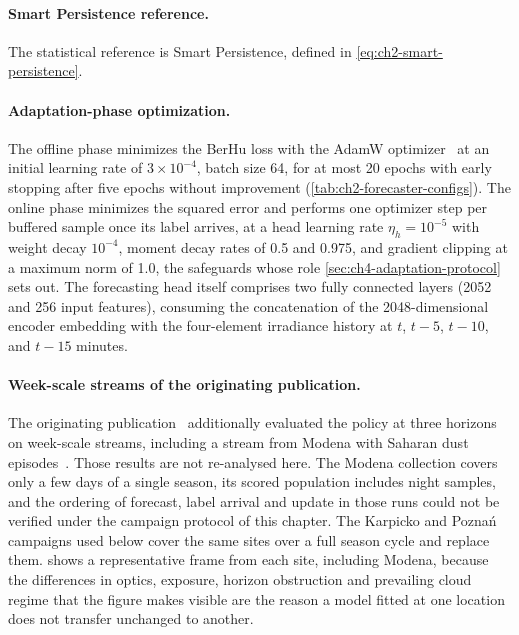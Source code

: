 \paragraph{Smart Persistence reference.} The statistical reference is Smart Persistence, defined in \cref{eq:ch2-smart-persistence}.

\paragraph{Adaptation-phase optimization.} The offline phase minimizes the BerHu loss with the AdamW optimizer~\cite{loshchilov2019decoupled} at an initial learning rate of $3\times10^{-4}$, batch size 64, for at most 20 epochs with early stopping after five epochs without improvement (\cref{tab:ch2-forecaster-configs}). The online phase minimizes the squared error and performs one optimizer step per buffered sample once its label arrives, at a head learning rate $\eta_h = 10^{-5}$ with weight decay $10^{-4}$, moment decay rates of \num{0.5} and \num{0.975}, and gradient clipping at a maximum norm of \num{1.0}, the safeguards whose role \cref{sec:ch4-adaptation-protocol} sets out.
The forecasting head itself comprises two fully connected layers (\num{2052} and \num{256} input features), consuming the concatenation of the \num{2048}-dimensional encoder embedding with the four-element irradiance history at $t$, $t-5$, $t-10$, and $t-15$ minutes.

\paragraph{Week-scale streams of the originating publication.} The originating publication~\cite{10.1007/978-3-032-07343-328} additionally evaluated the policy at three horizons on week-scale streams, including a stream from Modena with Saharan dust episodes~\cite{PIECHOCKI2026127533}. Those results are not re-analysed here. The Modena collection covers only a few days of a single season, its scored population includes night samples, and the ordering of forecast, label arrival and update in those runs could not be verified under the campaign protocol of this chapter. The Karpicko and Poznań campaigns used below cover the same sites over a full season cycle and replace them.  shows a representative frame from each site, including Modena, because the differences in optics, exposure, horizon obstruction and prevailing cloud regime that the figure makes visible are the reason a model fitted at one location does not transfer unchanged to another.

